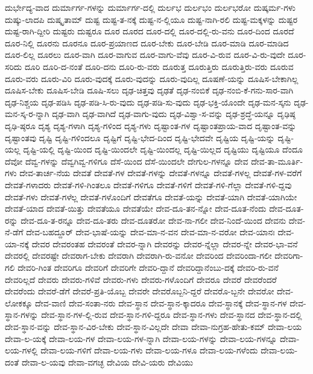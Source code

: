 {ದುರ್ಭೇದ್ಯ-ವಾದ
ದುರ್ಮಾರ್ಗ-ಗಳನ್ನು
ದುರ್ಮಾರ್ಗ-ದಲ್ಲಿ
ದುರ್ಲಭ
ದುರ್ಲಭಂ
ದುರ್ಲಭರೋ
ದುಷ್ಕರ್ಮ-ಗಳು
ದುಷ್ಕು-ಲಾದಪಿ
ದುಷ್ಕೃತಾಮ್
ದುಷ್ಟ
ದುಷ್ಟ-ತ-ನಕ್ಕೆ
ದುಷ್ಟ-ನ-ಲ್ಲಿಯೂ
ದುಷ್ಟ-ನಾಗಿ-ರಲಿ
ದುಷ್ಟ-ಮಕ್ಕಳನ್ನು
ದುಷ್ಟರ
ದುಷ್ಟ-ರಾಗಿ-ದ್ದೀರಿ
ದುಷ್ಟರು
ದುಷ್ಟರೂ
ದೂರ
ದೂರದ
ದೂರ-ದಲ್ಲಿ
ದೂರ-ದಲ್ಲಿ-ರು-ವನು
ದೂರ-ದಿಂದ
ದೂರದೆ
ದೂರ-ನಿಲ್ಲಿ
ದೂರನು
ದೂರನೂ
ದೂರ-ಪ್ರಯಾಣದ
ದೂರ-ಬೇಕು
ದೂರ-ಬೇಡಿ
ದೂರ-ಮಾಡಿ
ದೂರ-ಮಾಡಿದ
ದೂರ-ಲಿಲ್ಲ
ದೂರಲು
ದೂರ-ವಾಗಿ
ದೂರ-ವಾಗುವ
ದೂರ-ವಾಗು-ವೆವು
ದೂರ-ವಿ-ರುವ
ದೂರ-ವಿ-ರು-ವುದೇ
ದೂರ-ಸರಿದು
ದೂರಿ
ದೂರಿ-ದ-ನಂತೆ
ದೂರಿ-ದನು
ದೂರಿ-ರು-ವರು
ದೂರುತ್ತ
ದೂರುತ್ತಿರು
ದೂರುತ್ತಿರು-ವರು
ದೂರುವ
ದೂರು-ವರು
ದೂರು-ವಿರಿ
ದೂರು-ವುದಕ್ಕೆ
ದೂರು-ವುದನ್ನು
ದೂರು-ವುದಿಲ್ಲ
ದೂಷಣೆ-ಯನ್ನು
ದೂಷಿಸ-ಬೇಕಾಗಿಲ್ಲ
ದೂಷಿಸ-ಬೇಕು
ದೂಷಿಸ-ಬೇಡಿ
ದೂಷಿ-ಸಲು
ದೃಢ-ಚಿತ್ತವು
ದೃಢತೆ
ದೃಢ-ನಂಬಿಕೆ
ದೃಢ-ನಂಬಿ-ಕೆ-ಗನು-ಸಾರ-ವಾಗಿ
ದೃಢ-ನಿಶ್ಚಯ
ದೃಢ-ಪಡಿಸಿ
ದೃಢ-ಪಡಿ-ಸಿ-ರು-ವುದು
ದೃಢ-ಪಡಿ-ಸು-ವುದು
ದೃಢ-ಭಕ್ತಿ-ಯೊಂದೇ
ದೃಢ-ಮನ-ಸ್ಕನು
ದೃಢ-ಮನ-ಸ್ಕ-ರ-ನ್ನಾಗಿ
ದೃಢ-ವಾಗಿ
ದೃಢ-ವಾಗಿದೆ
ದೃಢ-ವಾಗು-ವುದು
ದೃಢ-ವಿಶ್ವಾ-ಸ-ವನ್ನು
ದೃಢ-ಶ್ರದ್ಧೆ-ಯನ್ನೂ
ದೃಢಿಷ್ಠ
ದೃಢಿ-ಷ್ಠರೂ
ದೃಶ್ಯ
ದೃಶ್ಯ-ಗಳಾಗಿ
ದೃಶ್ಯ-ಗಳಿಂದ
ದೃಶ್ಯ-ಗಳು
ದೃಷ್ಟಾಂತ-ಗಳ
ದೃಷ್ಟಾಂತಪ್ರಾಯ-ವಾದ
ದೃಷ್ಟಾಂತ-ವನ್ನು
ದೃಷ್ಟಾಂತವು
ದೃಷ್ಟಿ
ದೃಷ್ಟಿ-ಗಳಿಂದಲೂ
ದೃಷ್ಟಿಗೆ
ದೃಷ್ಟಿ-ಭೇದ-ದಿಂದ
ದೃಷ್ಟಿ-ಭೇದವೇ
ದೃಷ್ಟಿಯ
ದೃಷ್ಟಿ-ಯನ್ನು
ದೃಷ್ಟಿ-ಯಲ್ಲ
ದೃಷ್ಟಿ-ಯಲ್ಲಿ
ದೃಷ್ಟಿ-ಯಿಂದ
ದೃಷ್ಟಿ-ಯಿಂದಲೇ
ದೃಷ್ಟಿ-ಯಿಂದಲ್ಲ
ದೃಷ್ಟಿ-ಯಿಲ್ಲದ
ದೃಷ್ಟಿಯು
ದೃಷ್ಟಿಯೂ
ದೆಂದೂ
ದೆವೋ
ದೆವ್ವ-ಗಳನ್ನು
ದೆವ್ವಗಿವ್ವ-ಗಳಿಗೂ
ದೆಸೆ-ಯಿಂದ
ದೆಸೆ-ಯಿಂದಲೇ
ದೇಗುಲ-ಗಳನ್ನೂ
ದೇವ
ದೇವ-ತಾ-ಮೂರ್ತಿ-ಗಳು
ದೇವ-ತಾರ್ಚ-ನೆಯ
ದೇವತೆ
ದೇವತೆ-ಗಳ
ದೇವತೆ-ಗಳನ್ನು
ದೇವತೆ-ಗಳನ್ನೂ
ದೇವತೆ-ಗಳಲ್ಲ
ದೇವತೆ-ಗಳ-ವರೆಗೆ
ದೇವತೆ-ಗಳಾದರು
ದೇವತೆ-ಗಳಿ-ಗಿಂತಲೂ
ದೇವತೆ-ಗಳಿಗೂ
ದೇವತೆ-ಗಳಿಗೆ
ದೇವತೆ-ಗಳಿ-ಗೆಲ್ಲಾ
ದೇವತೆ-ಗಳಿ-ದ್ದವು
ದೇವತೆ-ಗಳು
ದೇವತೆ-ಗಳೆಲ್ಲ
ದೇವತೆ-ಗಳೊಂದಿಗೆ
ದೇವತೆಗೂ
ದೇವತೆ-ಯನ್ನು
ದೇವತೆ-ಯಾಗಿ
ದೇವತೆ-ಯಾಗಿಯೇ
ದೇವತೆ-ಯಾದ
ದೇವತೆ-ಯಿತ್ತು
ದೇವತೆಯೂ
ದೇವತೆಯೇ
ದೇವ-ದೂ-ತನ-ನ್ನೋ
ದೇವ-ದೂತ-ನೆಂದು
ದೇವ-ದೂತ-ರನ್ನು
ದೇವ-ದೂ-ತ-ರನ್ನೂ
ದೇವ-ದೂ-ತರು
ದೇವ-ದೂತರೋ
ದೇವ-ನಾ-ಗಲೀ
ದೇವ-ನಿಂದೆ-ಯಿಂದ
ದೇವನು
ದೇವ-ನೆ-ಡೆಗೆ
ದೇವ-ಬಹದ್ದೂರ್
ದೇವ-ಭಾಷೆ-ಯನ್ನು
ದೇವ-ಮಾ-ನ-ವನ
ದೇವ-ಮಾ-ನ-ವರೋ
ದೇವ-ಯಾನಃ
ದೇವ-ಯಾ-ನಕ್ಕೆ
ದೇವರ
ದೇವರಂತಹ
ದೇವರಂತೆ
ದೇವರ-ನ್ನಾಗಿ
ದೇವರನ್ನು
ದೇವರ-ನ್ನೆಲ್ಲಾ
ದೇವರ-ನ್ನೇ
ದೇವರ-ಭಾ-ವನೆ
ದೇವರಲ್ಲಿ
ದೇವರಷ್ಟೇ
ದೇವರಾಗ-ಬೇಕು
ದೇವರಾಗಿ
ದೇವರಾಗಿ-ರು-ವನೋ
ದೇವರಿಂದ
ದೇವರಿಂದಾ-ಗಲೀ
ದೇವರಿಗಾ-ಗಲಿ
ದೇವರಿ-ಗಿಂತ
ದೇವರಿಗೂ
ದೇವರಿಗೆ
ದೇವರಿಗೇ
ದೇವರಿ-ದ್ದಾನೆ
ದೇವರಿದ್ದಾನೆಂಬು-ದಕ್ಕೆ
ದೇವರಿ-ರು-ವನೆ
ದೇವರಿಲ್ಲದೆ
ದೇವರು
ದೇವರು-ಗಳಿವೆ
ದೇವರು-ಗಳು
ದೇವರು-ಗಳೊಂದಿಗೆ
ದೇವರೂ
ದೇವರೆ
ದೇವರೆಂದರೆ
ದೇವರೆಂದು
ದೇವರೆ-ಡೆಗೆ
ದೇವರೆ-ಪ್ರತಿ-ಯೊಬ್ಬ
ದೇವರೇ
ದೇವರೊಬ್ಬನಿ-ದ್ದರೆ
ದೇವರೊ-ಬ್ಬನೇ
ದೇವರೋ
ದೇವ-ಲೋಕಕ್ಕೂ
ದೇವ-ವಾಣಿ
ದೇವ-ಸಂತಾ-ನರು
ದೇವ-ಸ್ಥಾನ
ದೇವ-ಸ್ಥಾನ-ಕ್ಕಾದರೂ
ದೇವ-ಸ್ಥಾನಕ್ಕೆ
ದೇವ-ಸ್ಥಾನ-ಗಳ
ದೇವ-ಸ್ಥಾನ-ಗಳನ್ನು
ದೇವ-ಸ್ಥಾನ-ಗಳ-ಲ್ಲಿ-ರುವ
ದೇವ-ಸ್ಥಾನ-ಗಳಿ-ದ್ದರೂ
ದೇವ-ಸ್ಥಾನ-ಗಳು
ದೇವ-ಸ್ಥಾನದ
ದೇವ-ಸ್ಥಾನ-ದಲ್ಲಿ
ದೇವ-ಸ್ಥಾನ-ವನ್ನು
ದೇವ-ಸ್ಥಾನ-ವಿರ-ಬೇಕು
ದೇವ-ಸ್ಥಾನ-ವಿಲ್ಲದೇ
ದೇವಾ
ದೇವಾ-ನುಗ್ರಹ-ಹೇತು-ಕಮ್
ದೇವಾ-ಲಯ
ದೇವಾ-ಲ-ಯಕ್ಕೆ
ದೇವಾ-ಲಯ-ಗಳ
ದೇವಾ-ಲಯ-ಗಳ-ನ್ನಾಗಿ
ದೇವಾ-ಲಯ-ಗಳನ್ನು
ದೇವಾ-ಲಯ-ಗಳನ್ನೂ
ದೇವಾ-ಲಯ-ಗಳಲ್ಲಿ
ದೇವಾ-ಲಯ-ಗಳಿಗೆ
ದೇವಾ-ಲಯ-ಗಳು
ದೇವಾ-ಲಯ-ಗಳೂ
ದೇವಾ-ಲಯ-ಗಳೆಂದು
ದೇವಾ-ಲಯ-ದಂತೆ
ದೇವಾ-ಲ-ಯವು
ದೇವಾ-ವಗಚ್ಛ
ದೇವಿಯ
ದೇವಿ-ಯರು
ದೇವಿಯು
}
